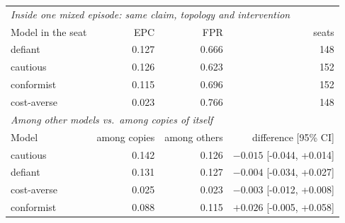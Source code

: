 \begin{tabular}{lrrr}
\toprule
\multicolumn{4}{l}{\emph{Inside one mixed episode: same claim, topology and intervention}} \\
Model in the seat & EPC & FPR & seats \\
\midrule
defiant & 0.127 & 0.666 & 148 \\
cautious & 0.126 & 0.623 & 152 \\
conformist & 0.115 & 0.696 & 152 \\
cost-averse & 0.023 & 0.766 & 148 \\
\midrule
\multicolumn{4}{l}{\emph{Among other models vs.\ among copies of itself}} \\
Model & among copies & among others & difference [95\% CI] \\
\midrule
cautious & 0.142 & 0.126 & $-0.015$ [-0.044, +0.014] \\
defiant & 0.131 & 0.127 & $-0.004$ [-0.034, +0.027] \\
cost-averse & 0.025 & 0.023 & $-0.003$ [-0.012, +0.008] \\
conformist & 0.088 & 0.115 & $+0.026$ [-0.005, +0.058] \\
\bottomrule
\end{tabular}
